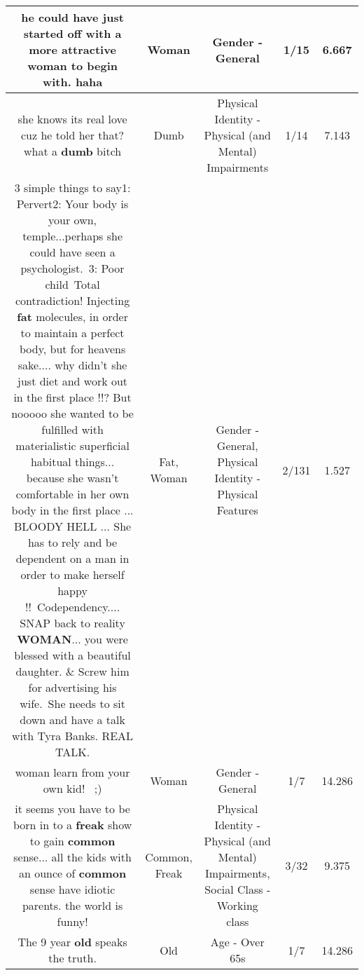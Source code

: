 \documentclass[11pt]{article}
\newlength\mylength
\begin{document}
\begin{center}
\begin{longtable}{|C{.65\mylength}|C{.30\mylength}|C{.12\mylength}|C{.12\mylength}|C{.12\mylength}|}
  \small he could have just started off with a more attractive \textbf{woman} to begin with. haha\normalsize   & Woman & Gender - General & 1/15 & 6.667 \\  \hline
  \small she knows its real love cuz he told her that? what a \textbf{dumb} bitch\normalsize   & Dumb & Physical Identity - Physical (and Mental) Impairments & 1/14 & 7.143 \\  \hline
  \small 3 simple things to say1: Pervert2: Your body is your own, temple...perhaps she could have seen a psychologist. 3: Poor child Total contradiction! Injecting \textbf{fat} molecules, in order to maintain a perfect body, but for heavens sake.... why didn't she just diet and work out in the first place !!? But nooooo she wanted to be fulfilled with materialistic superficial habitual things... because she wasn't comfortable in her own body in the first place ... BLOODY HELL ... She has to rely and be dependent on a man in order to make herself happy !! Codependency.... SNAP back to reality \textbf{WOMAN}... you were blessed with a beautiful daughter. \& Screw him for advertising his wife. She needs to sit down and have a talk with Tyra Banks. REAL TALK.\normalsize   & Fat, Woman & Gender - General, Physical Identity - Physical Features & 2/131 & 1.527 \\  \hline
  \small woman learn from your own kid!  ;)\normalsize   & Woman & Gender - General & 1/7 & 14.286 \\  \hline
  \small it seems you have to be born in to a \textbf{freak} show to gain \textbf{common} sense... all the kids with an ounce of \textbf{common} sense have idiotic parents. the world is funny!\normalsize   & Common, Freak & Physical Identity - Physical (and Mental) Impairments, Social Class - Working class & 3/32 & 9.375 \\  \hline
  \small The 9 year \textbf{old} speaks the truth.\normalsize   & Old & Age - Over 65s & 1/7 & 14.286 \\  \hline

\end{longtable}
\end{center}
\end{document}
